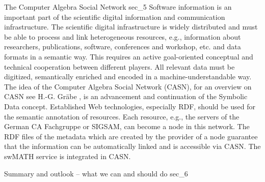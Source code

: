 \documentclass[a4paper,11pt]{article}
\begin{document}
\begin{multicols}{2}
\Ueberschrift
{The Computer Algebra Social Network}
{sec_5}
Software information is an important part of the scientific digital information and communication infrastructure. The scientific digital infrastructure is  widely distributed and must be able to process and link heterogeneous resources, e.g., information about researchers,  publications, software, conferences and workshop, etc. and data formats  in a semantic way.
This requires an active goal-oriented conceptual and technical cooperation between different players. All relevant data must be digitized, semantically enriched and encoded in a machine-understandable way.
The idea of the Computer Algebra Social Network (CASN), for an overview on CASN see H.-G. Gr\"abe \cite{CASN},   is an advancement and continuation of the Symbolic Data concept. Established Web technologies, especially RDF, should be used for the semantic annotation of resources. Each resource, e.g., the servers of the German CA Fachgruppe or SIGSAM, can become a node in this network. The RDF files of the metadata which are created by the provider of a node guarantee that the information can be automatically linked and is accessible via CASN. The swMATH service is integrated in CASN.

\Ueberschrift
{Summary and outlook -- what we can and should do}
{sec_6}


\end{multicols}
\end{document}
